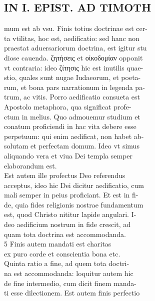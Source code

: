 \documentclass{article}
\begin{document}
\begin{pages}
\section*{IN I. EPIST. AD TIMOTH \\
                }
mum est ab vsu. Finis totius doctrinae est cer- \\
                ta vtilitas, hoc est, aedificatio: sed hanc non \\
                praestat aduersariorum doctrina, est igitur stu \\
                diose cauenda. ζητήσεις et οἰκοδομίαν opponit \\
                vt contraria: ideo ζίτησις hic est inutilis quae- \\
                stio, quales sunt nugae Iudaeorum, et poeta- \\
                rum, et bona pars narrationum in legenda pa- \\
                trum, ac vitis. Porro aedificatio consueta est \\
                Apostolo metaphora, qua significat profe- \\
                ctum in melius. Quo admouemur studium et \\
                conatum proficiendi in hac vita debere esse \\
                perpetuum: qui enim aedificat, non habet ab- \\
                solutam et perfectam domum. Ideo vt simus \\
                aliquando vera et viua Dei templa semper \\
                elaborandum est. \\
                Est autem ille profectus Deo referendus \\
                acceptus, ideo hic Dei dicitur aedificatio, cum \\
                mali semper in peius proficiant. Et est in fi- \\
                de, quia fides religionis nostrae fundamentum \\
                est, quod Christo nititur lapide angulari. I- \\
                deo aedificium nostrum in fide crescit, ad \\
                quam tota doctrina est accommodanda. \\
                5 Finis autem mandati est charitas \\
                ex puro corde et conscientia bona etc. \\
                Quinta ratio a fine, ad quem tota doctri- \\
                na est accommodanda: loquitur autem hic \\
                de fine intermedio, cum dicit finem manda- \\
                ti esse dilectionem. Est autem finis perfectio \\
                

\end{pages}
\end{document}
